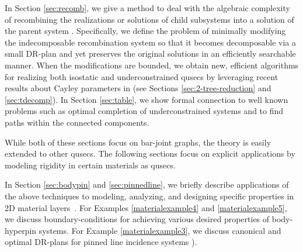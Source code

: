 In Section \ref{sec:recomb}, we give a method to deal with the algebraic complexity of recombining the realizations or solutions of child subsystems into a solution of the parent system \cite{sitharam2010optimized,sitharam2006well,sitharam2010reconciling}. Specifically, we define the problem of minimally modifying the indecomposable recombination system so that it becomes decomposable via a small DR-plan and yet preserves the original solutions in an efficiently searchable manner.
%
When the modifications are bounded, we obtain new, efficient algorithms for realizing both isostatic and underconstrained qusecs by leveraging recent results about Cayley parameters in \cite{sitharam2010convex,sitharam2011cayleyI,sitharam2011cayleyII} (see Sections \ref{sec:2-tree-reduction} and \ref{sec:tdecomp}).
%
In Section \ref{sec:table}, we show formal connection to well known problems such as optimal completion of underconstrained systems \cite{joan-arinyo2003transforming,sitharam2005combinatorial,gao2006ctree} and to find paths within the connected components.


While both of these sections focus on bar-joint graphs, the theory is easily extended to other qusecs. The following sections focus on explicit applications by modeling rigidity in certain materials as qusecs.

In Section \ref{sec:bodypin} and \ref{sec:pinnedline}, we briefly describe applications of the above techniques to modeling, analyzing, and designing specific properties in 2D material layers~\cite{Jackson2008bodypin}. For Examples \ref{materialexample4} and \ref{materialexample5}, we discuss boundary-conditions for achieving various desired properties of body-hyperpin systems. For Example \ref{materialexample3}, we discuss canonical and optimal DR-plans for pinned line incidence systems \cite{sitharam2014incidence}).

